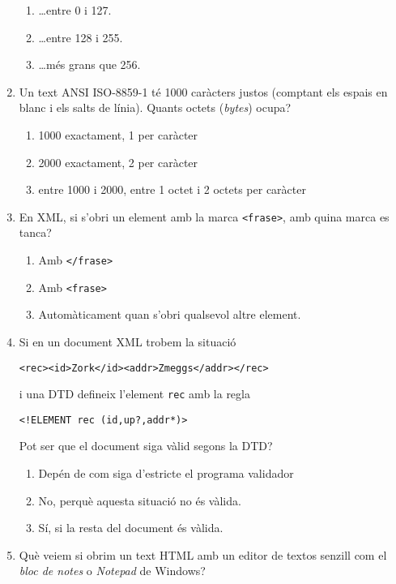 \begin{enumerate}
\begin{enumerate}
\item {\ldots}entre 0 i 127.
\item {\ldots}entre 128 i 255.
\item {\ldots}més grans que 256.
\end{enumerate}
\item Un text ANSI ISO-8859-1 té 1000 caràcters justos (comptant
   els espais en blanc i els salts de línia). Quants octets
   (\emph{bytes}) ocupa?
   
\begin{enumerate}
\item 1000 exactament, 1 per caràcter
\item 2000 exactament, 2 per caràcter
\item entre 1000 i 2000, entre 1 octet i 2 octets per caràcter
\end{enumerate}
\item En XML, si s'obri un element amb la marca
   \verb|<frase>|, amb quina marca es tanca?
   
\begin{enumerate}
\item Amb \verb|</frase>|
\item Amb \verb|<frase>|
\item Automàticament quan s'obri qualsevol altre element.
\end{enumerate}
\item   
   Si en un document XML trobem la situació
   \begin{center}\verb|<rec><id>Zork</id><addr>Zmeggs</addr></rec>|\end{center}   i una DTD defineix l'element \verb|rec| amb la regla
   \begin{center}\verb|<!ELEMENT rec (id,up?,addr*)>|\end{center} Pot
   ser que el document siga vàlid segons la DTD?
   
\begin{enumerate}
\item Depén de com siga d'estricte el programa validador
\item No, perquè aquesta situació no és vàlida.
\item Sí, si la resta del document és vàlida.
\end{enumerate}

\item 
   Què veiem si obrim un text HTML amb un editor de textos senzill com
   el \emph{bloc de notes} o \emph{Notepad} de Windows?
   

\end{enumerate}
